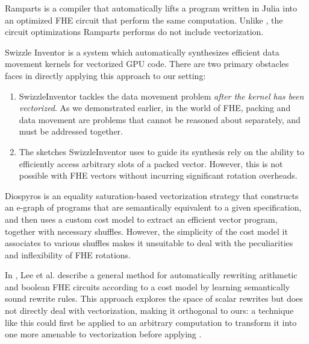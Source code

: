 Ramparts \cite{Ramparts} is a compiler that automatically lifts a program written in Julia into an optimized FHE circuit that perform the same computation.
Unlike \system, the circuit optimizations Ramparts performs do not include vectorization.

Swizzle Inventor \cite{SwizzleInventor} is a system which automatically synthesizes efficient data movement kernels for vectorized GPU code.
There are two primary obstacles \system faces in directly applying this approach to our setting:
\begin{enumerate}
    \item SwizzleInventor tackles the data movement problem {\em after the kernel has been vectorized}. As we demonstrated earlier, in the world of FHE, packing and data movement are problems that cannot be reasoned about separately, and must be addressed together.
    \item The sketches SwizzleInventor uses to guide its synthesis rely on the ability to efficiently access arbitrary slots of a packed vector. However, this is not possible with FHE vectors without incurring significant rotation overheads.
\end{enumerate}

Diospyros \cite{Diospyros} is an equality saturation-based vectorization strategy that constructs an e-graph of programs that are semantically equivalent to a given specification, and then uses a custom cost model to extract an efficient vector program, together with necessary shuffles.
However, the simplicity of the cost model it associates to various shuffles makes it unsuitable to deal with the peculiarities and inflexibility of FHE rotations.

In \cite{CircuitRewriting}, Lee et al. describe a general method for automatically rewriting arithmetic and boolean FHE circuits according to a cost model by learning semantically sound rewrite rules.
This approach explores the space of scalar rewrites but does not directly deal with vectorization, making it orthogonal to ours: a technique like this could first be applied to an arbitrary computation to transform it into one more amenable to vectorization before applying \system.

